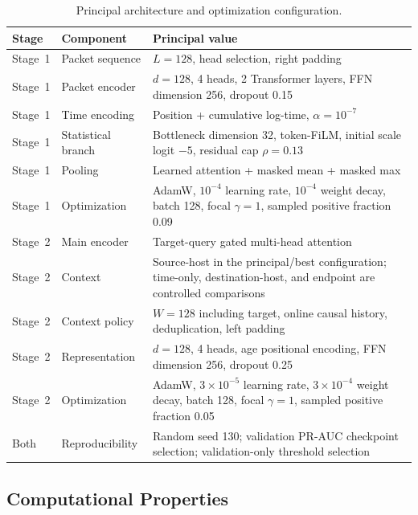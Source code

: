 \begin{table}[t]
    \centering
    \caption{Principal architecture and optimization configuration.}
    \label{tab:principal_method_config}
    \small
    \begin{tabular}{@{}p{2.0cm}p{4.4cm}p{7.6cm}@{}}
        \toprule
        Stage & Component & Principal value \\
        \midrule
        Stage~1 & Packet sequence & $L=128$, head selection, right padding \\
        Stage~1 & Packet encoder & $d=128$, 4 heads, 2 Transformer layers,
        FFN dimension 256, dropout 0.15 \\
        Stage~1 & Time encoding & Position + cumulative log-time,
        $\alpha=10^{-7}$ \\
        Stage~1 & Statistical branch & Bottleneck dimension 32, token-FiLM,
        initial scale logit $-5$, residual cap $\rho=0.13$ \\
        Stage~1 & Pooling & Learned attention + masked mean + masked max \\
        Stage~1 & Optimization & AdamW, $10^{-4}$ learning rate,
        $10^{-4}$ weight decay, batch 128, focal $\gamma=1$,
        sampled positive fraction 0.09 \\
        \midrule
        Stage~2 & Main encoder & Target-query gated multi-head attention \\
        Stage~2 & Context & Source-host in the principal/best configuration;
        time-only, destination-host, and endpoint are controlled comparisons \\
        Stage~2 & Context policy & $W=128$ including target, online causal
        history, deduplication, left padding \\
        Stage~2 & Representation & $d=128$, 4 heads, age positional encoding,
        FFN dimension 256, dropout 0.25 \\
        Stage~2 & Optimization & AdamW, $3\times10^{-5}$ learning rate,
        $3\times10^{-4}$ weight decay, batch 128, focal $\gamma=1$,
        sampled positive fraction 0.05 \\
        Both & Reproducibility & Random seed 130; validation PR-AUC checkpoint
        selection; validation-only threshold selection \\
        \bottomrule
    \end{tabular}
\end{table}

\subsection{Computational Properties}
\label{subsec:method_complexity}


